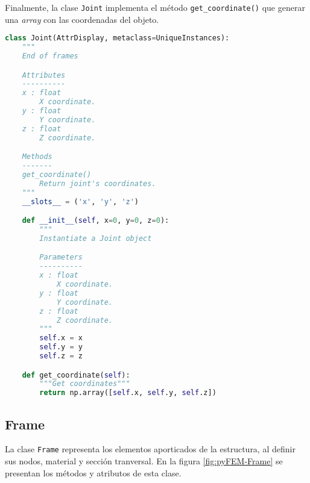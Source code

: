 Finalmente, la clase \verb|Joint| implementa el método \verb|get_coordinate()| que generar una \emph{array} con las coordenadas del objeto.\\
\pagebreak

\begin{lstlisting}[language=Python,caption=Clase \texttt{Joint} implementada en el archivo \texttt{primitives.py}.,label=alg:Joint, frame=single]
class Joint(AttrDisplay, metaclass=UniqueInstances):
    """
    End of frames

    Attributes
    ----------
    x : float
        X coordinate.
    y : float
        Y coordinate.
    z : float
        Z coordinate.

    Methods
    -------
    get_coordinate()
        Return joint's coordinates.
    """
    __slots__ = ('x', 'y', 'z')

    def __init__(self, x=0, y=0, z=0):
        """
        Instantiate a Joint object

        Parameters
        ----------
        x : float
            X coordinate.
        y : float
            Y coordinate.
        z : float
            Z coordinate.
        """
        self.x = x
        self.y = y
        self.z = z

    def get_coordinate(self):
        """Get coordinates"""
        return np.array([self.x, self.y, self.z])
\end{lstlisting}

\subsection{Frame}
La clase \verb|Frame| representa los elementos aporticados de la estructura, al definir sus nodos, material y sección tranversal. En la figura \ref{fig:pyFEM-Frame} se presentan los métodos y atributos de esta clase.\\

